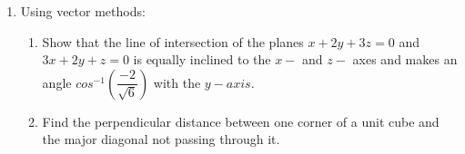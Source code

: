 \documentclass[fleqn]{article}
\begin{document}
\begin{enumerate}
  \item  Using vector methods:

  \begin{enumerate}
    \item Show that the line of intersection of the planes $x+2y+3z=0$ and $3x+2y+z=0$ is equally inclined to the $x-$ and $z-$ axes and makes an angle $cos^{-1}(\dfrac{-2}{\sqrt{6}})$ with the $y-axis$.
    
    \item Find the perpendicular distance between one corner of a unit cube and the major diagonal not passing through it.
  \end{enumerate} 
  
\end{enumerate}

\end{document}
